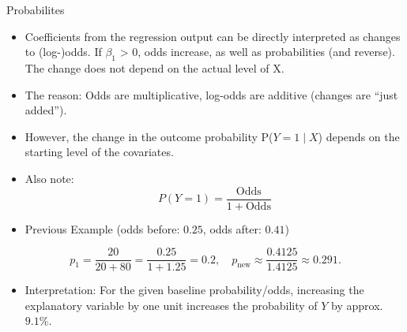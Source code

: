 \documentclass[
  10pt,
  ignorenonframetext,
]{beamer}
\providecommand{\tightlist}{%
  \setlength{\itemsep}{0pt}\setlength{\parskip}{0pt}}\usepackage{longtable,booktabs,array}
\begin{document}
\begin{frame}{Probabilites}
\label{probabilites}
\small

\begin{itemize}
\item
  Coefficients from the regression output can be directly interpreted as
  changes to (log-)odds. If \(\beta_1\) \textgreater{} 0, odds increase,
  as well as probabilities (and reverse). The change does not depend on
  the actual level of X.
\item
  The reason: Odds are multiplicative, log-odds are additive (changes
  are ``just added'').
\item
  However, the change in the outcome probability P(\(Y = 1 \mid X\))
  depends on the starting level of the covariates.
\item
  Also note: \[
  P(Y = 1) = \frac{\text{Odds}}{1 + \text{Odds}}
  \]
\item
  Previous Example (odds before: \(0.25\), odds after: \(0.41\))
\end{itemize}

\[
p_{\text{1}} = \frac{20}{20+80} = \frac{0.25}{1 + 1.25} = 0.2, \quad  p_{\text{new}} \approx \frac{0.4125}{1.4125} \approx 0.291.
\]

\begin{itemize}
\tightlist
\item
  Interpretation: For the given baseline probability/odds, increasing
  the explanatory variable by one unit increases the probability of
  \(Y\) by approx. \(9.1\%\).
\end{itemize}
\end{frame}
\end{document}

